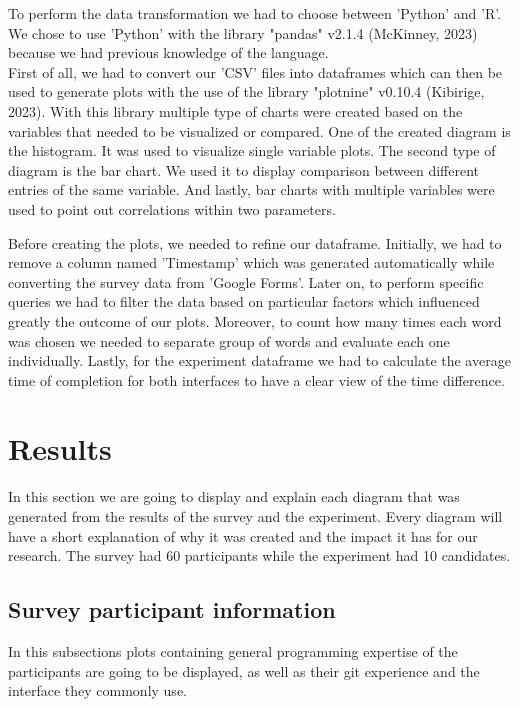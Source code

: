 \documentclass[]{report}
\begin{document}
	To perform the data transformation we had to choose between 'Python' and 'R'. We chose to use 'Python' with the library "pandas" v2.1.4 (McKinney, 2023) because we had previous knowledge of the language. \\
	
	First of all, we had to convert our 'CSV' files into dataframes which can then be used to generate plots with the use of the library "plotnine" v0.10.4 (Kibirige, 2023).  With this library multiple type of charts were created based on the variables that needed to be visualized or compared. One of the created diagram is the histogram. It was used to visualize single variable plots. The second type of diagram is the bar chart. We used it to display comparison between different entries of the same variable. And lastly, bar charts with multiple variables were used to point out correlations within two parameters.
	
	Before creating the plots, we needed to refine our dataframe. Initially, we had to remove a column named 'Timestamp' which was generated automatically while converting the survey data from 'Google Forms'. Later on, to perform specific queries we had to filter the data based on particular factors which influenced greatly the outcome of our plots. Moreover, to count how many times each word was chosen we needed to separate group of words and evaluate each one individually. Lastly, for the experiment dataframe we had to calculate the average time of completion for both interfaces to have a clear view of the time difference.
	\section{Results}
	In this section we are going to display and explain each diagram that was generated from the results of the survey and the experiment. Every diagram will have a short explanation of why it was created and the impact it has for our research. The survey had 60 participants while the experiment had 10 candidates. 
	
	\subsection{Survey participant information}

	In this subsections plots containing general programming expertise of the participants are going to be displayed, as well as their git experience and the interface they commonly use.\\
	
\end{document}
